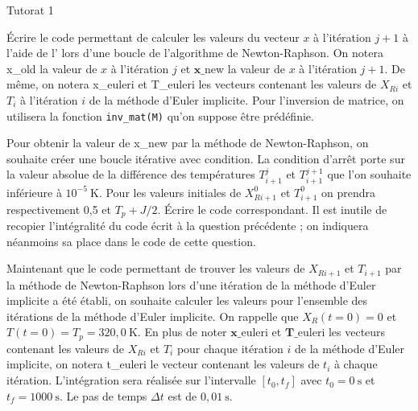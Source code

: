 \begin{exo}[PC][1][python]{Tutorat 1}
\begin{quest}
  \item Écrire le code permettant de calculer les valeurs du vecteur \(x\) à l'itération \(j+1\) à l'aide de l' lors d'une boucle de l'algorithme de Newton-Raphson. On notera x\_old la valeur de \(x\) à l'itération \(j\) et \(\mathbf{x} \_\)new la valeur de \(x\) à l'itération \(j+1\). De même, on notera x\_euleri et T\_euleri les vecteurs contenant les valeurs de \(X_{R i}\) et \(T_{i}\) à l'itération \(i\) de la méthode d'Euler implicite. Pour l'inversion de matrice, on utilisera la fonction \texttt{inv\_mat(M)} qu'on suppose être prédéfinie.
  
  \item Pour obtenir la valeur de x\_new par la méthode de Newton-Raphson, on souhaite créer une boucle itérative avec condition. La condition d'arrêt porte sur la valeur absolue de la différence des températures \(T_{i+1}^{j}\) et \(T_{i+1}^{j+1}\) que l'on souhaite inférieure à \(10^{-5} \mathrm{~K}\). Pour les valeurs initiales de \(X_{R i+1}^{0}\) et \(T_{i+1}^{0}\) on prendra respectivement 0,5 et \(T_{p}+J / 2\). Écrire le code correspondant. Il est inutile de recopier l'intégralité du code écrit à la question précédente ; on indiquera néanmoins sa place dans le code de cette question.
\end{quest}
  
  Maintenant que le code permettant de trouver les valeurs de \(X_{R i+1}\) et \(T_{i+1}\) par la méthode de Newton-Raphson lors d'une itération de la méthode d'Euler implicite a été établi, on souhaite calculer les valeurs pour l'ensemble des itérations de la méthode d'Euler implicite. On rappelle que \(X_{R}(t=0)=0\) et \(T(t=0)=T_{p}=320,0 \mathrm{~K}\). En plus de noter \(\mathbf{x} \_\)euleri et \(\mathbf{T} \_\)euleri les vecteurs contenant les valeurs de \(X_{R i}\) et \(T_{i}\) pour chaque itération \(i\) de la méthode d'Euler implicite, on notera t\_euleri le vecteur contenant les valeurs de \(t_{i}\) à chaque itération. L'intégration sera réalisée sur l'intervalle \(\left[t_{0}, t_{f}\right]\) avec \(t_{0}=0 \mathrm{~s}\) et \(t_{f}=1000 \mathrm{~s}\). Le pas de temps \(\Delta t\) est de \(0,01 \mathrm{~s}\).


\end{exo}
